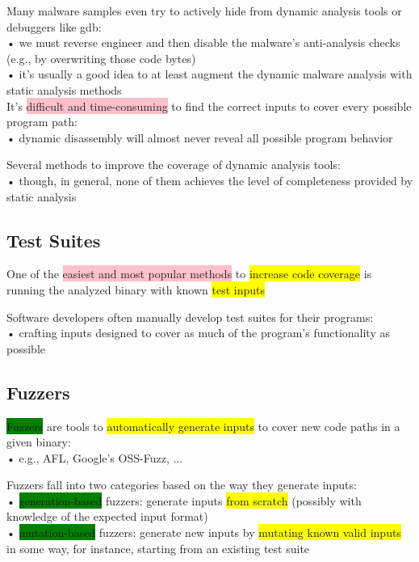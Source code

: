 \documentclass[]{project_plan}
\begin{document}
Many malware samples even try to actively hide from dynamic analysis tools or
debuggers like gdb:\\
• we must reverse engineer and then disable the malware’s anti-analysis checks
(e.g., by overwriting those code bytes)\\
• it’s usually a good idea to at least augment the dynamic malware analysis with
static analysis methods\\

It’s \colorbox{pink}{difficult and time-consuming} to find the correct inputs to cover every
possible program path:\\
• dynamic disassembly will almost never reveal all possible program behavior

Several methods to improve the coverage of dynamic analysis tools:\\
• though, in general, none of them achieves the level of completeness provided by
static analysis


\subsection{Test Suites}

One of the \colorbox{pink}{easiest and most popular methods} to \colorbox{yellow}{increase code coverage} is
running the analyzed binary with known \colorbox{yellow}{test inputs}

Software developers often manually develop test suites for their programs:\\
• crafting inputs designed to cover as much of the program’s functionality as
possible

\subsection{Fuzzers}

\colorbox{green}{Fuzzers} are tools to \colorbox{yellow}{automatically generate inputs} to cover new code paths in a
given binary:\\
• e.g., AFL, Google’s OSS-Fuzz, ...

Fuzzers fall into two categories based on the way they generate inputs:\\
• \colorbox{green}{generation-based} fuzzers: generate inputs \colorbox{yellow}{from scratch} (possibly with knowledge of
the expected input format)\\
• \colorbox{green}{mutation-based} fuzzers: generate new inputs by \colorbox{yellow}{mutating known valid inputs} in
some way, for instance, starting from an existing test suite
\end{document}
